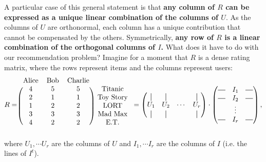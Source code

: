 A particular case of this general statement is that \textbf{any column of $R$
can be expressed as a unique linear combination of the columns of $U$}. As the
columns of $U$ are orthonormal, each column has a unique contribution that
cannot be compensated by the others. Symmetrically, \textbf{any row of $R$ is a
linear combination of the orthogonal columns of $I$.} What does it have to do
with our recommendation problem? Imagine for a moment that $R$ is a dense
rating matrix, where the rows represent items and the columns represent users:
$$
R = \begin{blockarray}{cccc}
  \text{Alice} & \text{Bob} & \text{Charlie} \\
\begin{block}{(ccc) c}
  4 & 5 & 5 & \text{Titanic} \\
  2 & 1 & 1 & \text{Toy Story} \\
  1 & 2 & 2 & \text{LORT} \\
  3 & 3 & 3 & \text{Mad Max} \\
  4 & 2 & 2 & \text{E.T.} \\
\end{block}
\end{blockarray}
=
\begin{pmatrix}
  \vertbar & \vertbar & & \vertbar\\
  U_1& U_2 & \cdots & U_r\\
  \vertbar & \vertbar & & \vertbar\\
\end{pmatrix}
\cdot
\begin{pmatrix}
  \horzbar& I_1 & \horzbar\\
  \horzbar& I_2 & \horzbar\\
   & \vdots & \\
  \horzbar& I_r &\horzbar \\
\end{pmatrix}
,
$$
where $U_1, \cdots U_r$ are the columns of $U$ and $I_1, \cdots I_r$ are the
columns of $I$ (i.e. the lines of $I^t$).

